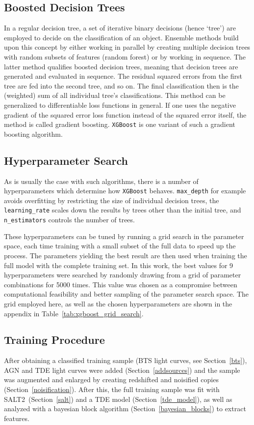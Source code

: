 \subsection{Boosted Decision Trees}
In a regular decision tree, a set of iterative binary decisions (hence `tree') are employed to decide on the classification of an object. Ensemble methods build upon this concept by either working in parallel by creating multiple decision trees with random subsets of features (random forest) or by working in sequence. The latter method qualifies boosted decision trees, meaning that decision trees are generated and evaluated in sequence. The residual squared errors from the first tree are fed into the second tree, and so on. The final classification then is the (weighted) sum of all individual tree's classifications. This method can be generalized to differentiable loss functions in general. If one uses the negative gradient of the squared error loss function instead of the squared error itself, the method is called gradient boosting. \texttt{XGBoost} is one variant of such a gradient boosting algorithm.

\subsection{Hyperparameter Search}
As is usually the case with such algorithms, there is a number of hyperparameters which determine how \texttt{XGBoost} behaves. \texttt{max\_depth} for example avoids overfitting by restricting the size of individual decision trees, the \texttt{learning\_rate} scales down the results by trees other than the initial tree, and \texttt{n\_estimators} controls the number of trees.

These hyperparameters can be tuned by running a grid search in the parameter space, each time training with a small subset of the full data to speed up the process. The parameters yielding the best result are then used when training the full model with the complete training set. In this work, the best values for 9 hyperparameters were searched by randomly drawing from a grid of parameter combinations for 5000 times. This value was chosen as a compromise between computational feasibility and better sampling of the parameter search space. The grid employed here, as well as the chosen hyperparameters are shown in the appendix in Table~\ref{tab:xgboost_grid_search}.

\subsection{Training Procedure}
After obtaining a classified training sample (BTS light curves, see Section~\ref{bts}), AGN and TDE light curves were added (Section~\ref{addsources}) and the sample was augmented and enlarged by creating redshifted and noisified copies (Section~\ref{noisification}). After this, the full training sample was fit with SALT2~(Section~\ref{salt}) and a TDE model (Section~\ref{tde_model}), as well as analyzed with a bayesian block algorithm (Section~\ref{bayesian_blocks}) to extract features.

